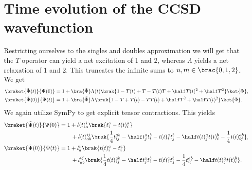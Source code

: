     \section{Time evolution of the CCSD wavefunction}
        Restricting ourselves to the singles and doubles approximation we will
        get that the $T$ operator can yield a net excitation of 1 and 2, whereas
        $\Lambda$ yields a net relaxation of 1 and 2. This truncates the
        infinite sums to $n, m \in \brac{0, 1, 2}$. We get
        \begin{align}
            \braket{\tilde{\Psi}(t)}{\Psi(0)}
            &= 1
            + \bra{\tilde{\Phi}}\Lambda(t)\brak{
                1 - T(t) + T - T(t)T
                + \half T(t)^2 + \half T^2
            }\ket{\Phi},
            \\
            \braket{\tilde{\Psi}(0)}{\Psi(t)}
            &= 1
            + \bra{\tilde{\Phi}}\Lambda\brak{
                1 - T + T(t) - TT(t)
                + \half T^2 + \half T(t)^2
            }\ket{\Phi}.
        \end{align}
        We again utilize SymPy\cite{sympy} to get explicit tensor contractions.
        This yields
        \begin{align}
            \braket{\tilde{\Psi}(t)}{\Psi(0)}
            &=
            1
            + l(t)^{i}_{a} \brak{
                t^{a}_{i} - t(t)^{a}_{i}
            }
            \nonumber \\
            &\qquad
            + l(t)^{ij}_{ab} \brak{
                \frac{1}{4}t^{ab}_{ij}
                - \half t^{a}_{j} t^{b}_{i}
                - t(t)^{a}_{i} t^{b}_{j}
                - \half t(t)^{a}_{j} t(t)^{b}_{i}
                - \frac{1}{4} t(t)^{ab}_{ij}
            },
            \\
            \braket{\tilde{\Psi}(0)}{\Psi(t)}
            &=
            1
            + l^{i}_{a} \brak{
                t(t)^{a}_{i}
                - t^{a}_{i}
            }
            \nonumber \\
            &\qquad
            + l^{ij}_{ab} \brak{
                \frac{1}{4}t(t)^{ab}_{ij}
                - \half t^{a}_{j} t^{b}_{i}
                - t(t)^{a}_{i}t^{b}_{j}
                - \frac{1}{4} t^{ab}_{ij}
                - \half t(t)^{a}_{j} t(t)^{b}_{i}
            }.
        \end{align}
